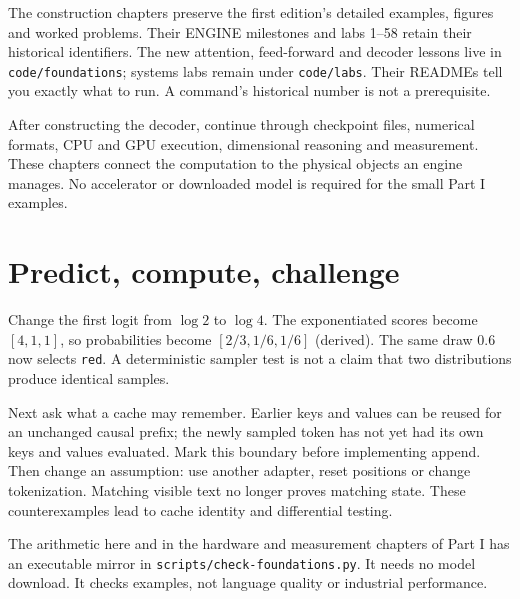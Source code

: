 The construction chapters preserve the first edition's detailed examples,
figures and worked problems. Their ENGINE milestones and labs 1--58
retain their historical identifiers. The new attention, feed-forward
and decoder lessons live in \texttt{code/foundations}; systems labs
remain under \texttt{code/labs}. Their READMEs tell you exactly what
to run. A command's historical number is not a prerequisite.

After constructing the decoder, continue through checkpoint files,
numerical formats, CPU and GPU execution, dimensional reasoning and
measurement. These chapters connect the computation to the physical
objects an engine manages. No accelerator or downloaded model is
required for the small Part I examples.

\section*{Predict, compute, challenge}
Change the first logit from $\log 2$ to $\log 4$. The exponentiated scores
become $[4,1,1]$, so probabilities become $[2/3,1/6,1/6]$ (derived).
The same draw $0.6$ now selects \texttt{red}. A deterministic sampler test
is not a claim that two distributions produce identical samples.

Next ask what a cache may remember. Earlier keys and values can be reused
for an unchanged causal prefix; the newly sampled token has not yet had
its own keys and values evaluated. Mark this boundary before implementing
append. Then change an assumption: use another adapter, reset positions
or change tokenization. Matching visible text no longer proves matching
state. These counterexamples lead to cache identity and differential testing.

The arithmetic here and in the hardware and measurement chapters of Part I has an executable mirror in
\texttt{scripts/check-foundations.py}. It needs no model download.
It checks examples, not language quality or industrial performance.
